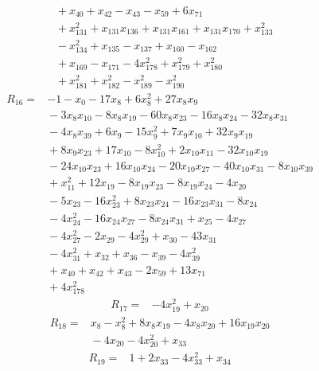 {\begin{align*}
&{}  + x_{40} + x_{42} - x_{43} - x_{59} + 6x_{71} \\
&{}  + x_{131}^{2} + x_{131} x_{136} + x_{131} x_{161} + x_{131} x_{170} + x_{133}^{2} \\
&{}  - x_{134}^{2} + x_{135} - x_{137} + x_{160} - x_{162} \\
&{}  + x_{169} - x_{171} - 4x_{178}^{2} + x_{179}^{2} + x_{180}^{2} \\
&{}  + x_{181}^{2} + x_{182}^{2} - x_{189}^{2} - x_{190}^{2}
\end{align*}
\begin{align*}
R_{16} ={}& -1 - x_{0} - 17x_{8} + 6x_{8}^{2} + 27x_{8} x_{9} \\
&{}  - 3x_{8} x_{10} - 8x_{8} x_{19} - 60x_{8} x_{23} - 16x_{8} x_{24} - 32x_{8} x_{31} \\
&{}  - 4x_{8} x_{39} + 6x_{9} - 15x_{9}^{2} + 7x_{9} x_{10} + 32x_{9} x_{19} \\
&{}  + 8x_{9} x_{23} + 17x_{10} - 8x_{10}^{2} + 2x_{10} x_{11} - 32x_{10} x_{19} \\
&{}  - 24x_{10} x_{23} + 16x_{10} x_{24} - 20x_{10} x_{27} - 40x_{10} x_{31} - 8x_{10} x_{39} \\
&{}  + x_{11}^{2} + 12x_{19} - 8x_{19} x_{23} - 8x_{19} x_{24} - 4x_{20} \\
&{}  - 5x_{23} - 16x_{23}^{2} + 8x_{23} x_{24} - 16x_{23} x_{31} - 8x_{24} \\
&{}  - 4x_{24}^{2} - 16x_{24} x_{27} - 8x_{24} x_{31} + x_{25} - 4x_{27} \\
&{}  - 4x_{27}^{2} - 2x_{29} - 4x_{29}^{2} + x_{30} - 43x_{31} \\
&{}  - 4x_{31}^{2} + x_{32} + x_{36} - x_{39} - 4x_{39}^{2} \\
&{}  + x_{40} + x_{42} + x_{43} - 2x_{59} + 13x_{71} \\
&{}  + 4x_{178}^{2}
\end{align*}
\begin{align*}
R_{17} ={}& -4x_{19}^{2} + x_{20}
\end{align*}
\begin{align*}
R_{18} ={}& x_{8} - x_{8}^{2} + 8x_{8} x_{19} - 4x_{8} x_{20} + 16x_{19} x_{20} \\
&{}  - 4x_{20} - 4x_{20}^{2} + x_{33}
\end{align*}
\begin{align*}
R_{19} ={}& 1 + 2x_{33} - 4x_{33}^{2} + x_{34}

\end{align*}}
